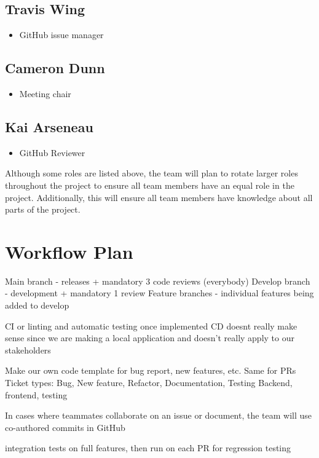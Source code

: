\documentclass{article}
\begin{document}
\subsection*{Travis Wing}
\begin{itemize}
	\item GitHub issue manager
\end{itemize}

\subsection*{Cameron Dunn}
\begin{itemize}
	\item Meeting chair
\end{itemize}

\subsection*{Kai Arseneau}
\begin{itemize}
	\item GitHub Reviewer
\end{itemize}

\noindent Although some roles are listed above, the team will plan to rotate larger roles throughout the project to ensure all team members have an equal role in the project.
Additionally, this will ensure all team members have knowledge about all parts of the project. 


\section{Workflow Plan}
Main branch - releases + mandatory 3 code reviews (everybody)
Develop branch - development + mandatory 1 review
Feature branches - individual features being added to develop

CI or linting and automatic testing once implemented
CD doesnt really make sense since we are making a local application and doesn't really apply to our stakeholders

Make our own code template for bug report, new features, etc. Same for PRs 
Ticket types: Bug, New feature, Refactor, Documentation, Testing
Backend, frontend, testing

In cases where teammates collaborate on an issue or document, the team will use co-authored commits in GitHub

integration tests on full features, then run on each PR for regression testing
\end{document}
